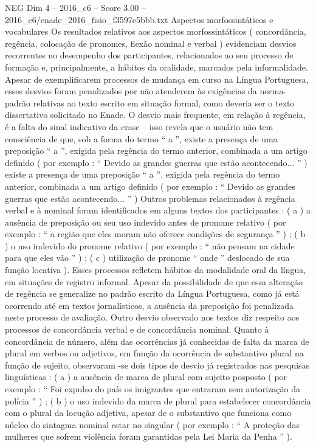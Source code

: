 \begin{textsample}{NEG Dim 4 – 2016\_c6 – Score 3.00 – 2016\_c6/enade\_2016\_fisio\_f3597e5bbb.txt}
Aspectos morfossintáticos e vocabulares Os resultados relativos aos aspectos morfossintáticos ( concordância, regência, colocação de pronomes, flexão nominal e verbal ) evidenciam desvios recorrentes no desempenho dos participantes, relacionados ao seu processo de formação e, principalmente, a hábitos da oralidade, marcados pela informalidade.
Apesar de exemplificarem processos de mudança em curso na Língua Portuguesa, esses desvios foram penalizados por não atenderem às exigências da norma-padrão relativas ao texto escrito em situação formal, como deveria ser o texto dissertativo solicitado no Enade.
O desvio mais frequente, em relação à regência, é a falta do sinal indicativo da crase – isso revela que o usuário não tem consciência de que, sob a forma do termo “ a ”, existe a presença de uma preposição “ a ”, exigida pela regência do termo anterior, combinada a um artigo definido ( por exemplo : “ Devido as grandes guerras que estão acontecendo... ” ) existe a presença de uma preposição “ a ”, exigida pela regência do termo anterior, combinada a um artigo definido ( por exemplo : “ Devido as grandes guerras que estão acontecendo... ” ) Outros problemas relacionados à regência verbal e à nominal foram identificados em alguns textos dos participantes : ( a ) a ausência de preposição ou seu uso indevido antes de pronome relativo ( por exemplo : “ a região que eles moram não oferece condições de segurança ” ) ; ( b ) o uso indevido do pronome relativo ( por exemplo : “ não pensam na cidade para que eles vão ” ) ; ( c ) utilização de pronome “ onde ” deslocado de sua função locativa ).
Esses processos refletem hábitos da modalidade oral da língua, em situações de registro informal.
Apesar da possibilidade de que essa alteração de regência se generalize no padrão escrito da Língua Portuguesa, como já está ocorrendo até em textos jornalísticos, a ausência da preposição foi penalizada neste processo de avaliação.
Outro desvio observado nos textos diz respeito aos processos de concordância verbal e de concordância nominal.
Quanto à concordância de número, além das ocorrências já conhecidas de falta da marca de plural em verbos ou adjetivos, em função da ocorrência de substantivo plural na função de sujeito, observaram -se dois tipos de desvio já registrados nas pesquisas linguísticas : ( a ) a ausência de marca de plural com sujeito posposto ( por exemplo : “ Foi expulso do país os imigrantes que entraram sem autorização da polícia ” ) ; ( b ) o uso indevido da marca de plural para estabelecer concordância com o plural da locução adjetiva, apesar de o substantivo que funciona como núcleo do sintagma nominal estar no singular ( por exemplo : “ A proteção das mulheres que sofrem violência foram garantidas pela Lei Maria da Penha ” ).

\end{textsample}
